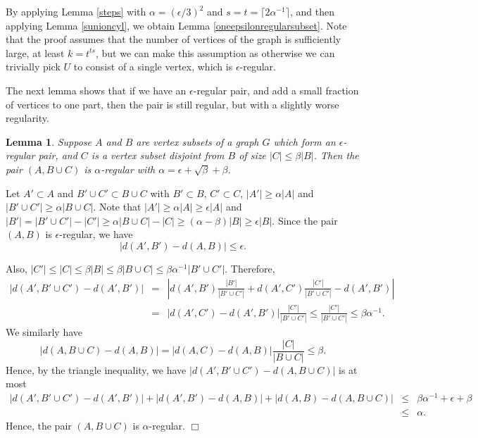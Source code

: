 \documentclass[11pt]{article}
\newtheorem{lemma}{Lemma}[section]
\newenvironment{proof}
      {\medskip\noindent{\bf Proof:}\hspace{1mm}}
      {\hfill$\Box$\medskip}
\begin{document}
By applying Lemma \ref{steps} with $\alpha=(\epsilon/3)^2$ and $s=t=\lceil
2\alpha^{-1} \rceil$, and then applying Lemma \ref{sunioncyl},  we obtain Lemma
\ref{oneepsilonregularsubset}. Note that the proof assumes that the number of vertices of the graph is sufficiently large, at least $k=t^{ts}$, but we can make this assumption as otherwise we can trivially pick $U$ to consist of a single vertex, which is $\epsilon$-regular. 


The next lemma shows that if we have an $\epsilon$-regular pair, and add a
small fraction of vertices to one part, then the pair is still regular, but
with a slightly worse regularity.

\begin{lemma}\label{partfoura}
Suppose $A$ and $B$ are vertex subsets of a graph $G$ which form an
$\epsilon$-regular pair, and $C$ is a vertex subset disjoint from $B$
of size $|C| \leq \beta|B|$. Then the pair $(A,B \cup C)$ is $\alpha$-regular
with $\alpha=\epsilon+\sqrt{\beta}+\beta$.
\end{lemma}
\begin{proof}
Let $A' \subset A$ and $B' \cup C' \subset B \cup C$ with $B' \subset B$, $C'
\subset C$, $|A'| \geq \alpha|A|$ and $|B'\cup C'| \geq \alpha|B \cup C|$. Note
that $|A'| \geq \alpha |A| \geq \epsilon|A|$ and $|B'|=|B' \cup C'|-|C'| \geq
\alpha|B \cup C|-|C| \geq (\alpha-\beta)|B| \geq \epsilon|B|$. Since the pair
$(A,B)$ is $\epsilon$-regular, we have $$\left | d(A',B')-d(A,B) \right | \leq
\epsilon.$$

Also, $|C'| \leq |C| \leq \beta |B| \leq \beta|B \cup C| \leq
\beta\alpha^{-1}|B' \cup C'|$. Therefore,
 \begin{eqnarray*}|d(A',B' \cup C')-d(A',B')| & = &
\left|d(A',B')\frac{|B'|}{|B' \cup C'|}+d(A',C')\frac{|C'|}{|B' \cup
C'|}-d(A',B')\right|\\ & = &  \left|d(A',C')-d(A',B')\right| \frac{|C'|}{|B'
\cup C'|}\leq \frac{|C'|}{|B' \cup C'|} \leq \beta\alpha^{-1}.
\end{eqnarray*}
We similarly have $$|d(A,B \cup
C)-d(A,B)|=\left|d(A,C)-d(A,B)\right|\frac{|C|}{|B \cup C|}  \leq \beta.$$
Hence, by the triangle inequality, we have $\left|d(A',B' \cup C')-d(A,B \cup
C)\right|$ is at most \begin{eqnarray*}  \left|d(A',B' \cup
C')-d(A',B')\right|+\left|d(A',B')-d(A,B)\right|+\left|d(A,B)-d(A,B \cup
C)\right|  & \leq &  \beta\alpha^{-1}+\epsilon+\beta \\ & \leq &
\alpha.\end{eqnarray*}
Hence, the pair $(A,B \cup C)$ is $\alpha$-regular.
\end{proof}
\end{document}
